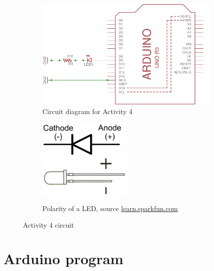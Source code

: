 \documentclass[12pt]{book}
\begin{document}
\begin{figure}
	 \centering
\begin{subfigure}[b]{0.55 \textwidth}
	\includegraphics{schem/Experiment4}
	\caption{Circuit diagram for Activity 4}
	\label{fig:SchemEx4}
\end{subfigure}
\hfill
\begin{subfigure}[b]{0.4\textwidth}
\centering
\includegraphics[width=0.5\textwidth]{schem/diode-schema.png}\\
\includegraphics[width=0.5\textwidth]{schem/diode-part.png}
\caption{Polarity of a LED, source \url{learn.sparkfun.com}}
\label{fig:diodeEx4}
\end{subfigure}
\caption{Activity 4 circuit}\label{fig:main4}
\end{figure}

\section{Arduino program}
\end{document}
